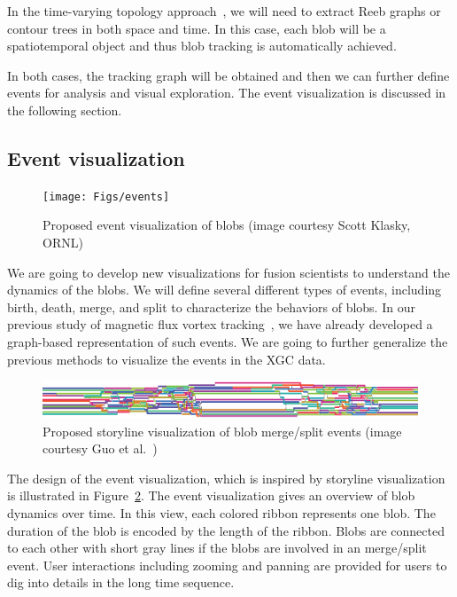In the time-varying topology approach~\cite{SohnB06}, we will need to extract Reeb graphs or contour trees in both space and time.  In this case, each blob will be a spatiotemporal object and thus blob tracking is automatically achieved.  

In both cases, the tracking graph will be obtained and then we can further define events for analysis and visual exploration.  The event visualization is discussed in the following section.  


\subsection{Event visualization}

\begin{figure}[!h]
  \centering
  \texttt{[image: Figs/events]}
  \caption{Proposed event visualization of blobs (image courtesy Scott Klasky, ORNL)}
  \label{fig:events}
\end{figure}

We are going to develop new visualizations for fusion scientists to understand the dynamics of the blobs.  We will define several different types of events, including birth, death, merge, and split to characterize the behaviors of blobs.  In our previous study of magnetic flux vortex tracking~\cite{GuoPPKG16, GuoPG17, PhillipsGPKG16, PhillipsPKG15}, we have already developed a graph-based representation of such events.  We are going to further generalize the previous methods to visualize the events in the XGC data.  

\begin{figure}[!h]
  \centering
  \includegraphics[width=\linewidth]{Figs/storyline}
  \caption{Proposed storyline visualization of blob merge/split events (image courtesy Guo et al.~\cite{GuoPPKG16})}
  \label{fig:storyline}
\end{figure}

The design of the event visualization, which is inspired by storyline visualization~\cite{TanahashiM12} is illustrated in Figure~\ref{fig:storyline}.  The event visualization gives an overview of blob dynamics over time.  In this view, each colored ribbon represents one blob.  The duration of the blob is encoded by the length of the ribbon.  Blobs are connected to each other with short gray lines if the blobs are involved in an merge/split event.  User interactions including zooming and panning are provided for users to dig into details in the long time sequence.  

